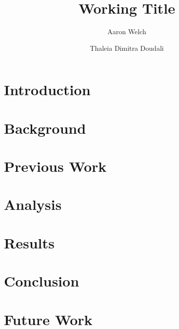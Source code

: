 \documentclass[runningheads]{llncs}
\begin{document}
\title{Working Title}
\author{Aaron Welch \and  Thaleia Dimitra Doudali}

\maketitle
\begin{abstract}

\end{abstract}
\section{Introduction}
\label{sec:intro}

\section{Background}
\label{sec:background}
\section{Previous Work}
\label{sec:prevwork}

\section{Analysis}
\label{sec:analysis}

\section{Results}
\label{sec:results}
\section{Conclusion}
\label{sec:conclusion}
\section{Future Work}
\label{sec:future}


\end{document}
